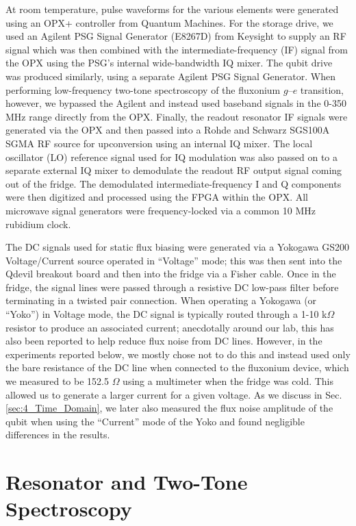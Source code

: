 At room temperature, pulse waveforms for the various elements were generated using an OPX+ controller from Quantum Machines. For the storage drive, we used an Agilent PSG Signal Generator (E8267D) from Keysight to supply an RF signal which was then combined with the intermediate-frequency (IF) signal from the OPX using the PSG's internal wide-bandwidth IQ mixer. The qubit drive was produced similarly, using a separate Agilent PSG Signal Generator. When performing low-frequency two-tone spectroscopy of the fluxonium $g$--$e$ transition, however, we bypassed the Agilent and instead used baseband signals in the 0-350 MHz range directly from the OPX. Finally, the readout resonator IF signals were generated via the OPX and then passed into a Rohde and Schwarz SGS100A SGMA RF source for upconversion using an internal IQ mixer. The local oscillator (LO) reference signal used for IQ modulation was also passed on to a separate external IQ mixer to demodulate the readout RF output signal coming out of the fridge. The demodulated intermediate-frequency I and Q components were then digitized and processed using the FPGA within the OPX. All microwave signal generators were frequency-locked via a common 10 MHz rubidium clock. 

The DC signals used for static flux biasing were generated via a Yokogawa GS200 Voltage/Current source operated in ``Voltage'' mode; this was then sent into the Qdevil breakout board and then into the fridge via a Fisher cable. Once in the fridge, the signal lines were passed through a resistive DC low-pass filter before terminating in a twisted pair connection. When operating a Yokogawa (or ``Yoko'') in Voltage mode, the DC signal is typically routed through a 1-10 k$\Omega$ resistor to produce an associated current; anecdotally around our lab, this has also been reported to help reduce flux noise from DC lines. However, in the experiments reported below, we mostly chose not to do this and instead used only the bare resistance of the DC line when connected to the fluxonium device, which we measured to be 152.5 $\Omega$ using a multimeter when the fridge was cold. This allowed us to generate a larger current for a given voltage. As we discuss in Sec. \ref{sec:4_Time_Domain}, we later also measured the flux noise amplitude of the qubit when using the ``Current'' mode of the Yoko and found negligible differences in the results. %

\section{Resonator and Two-Tone Spectroscopy\label{sec:4_Resonator_and_Two_Tone}}

